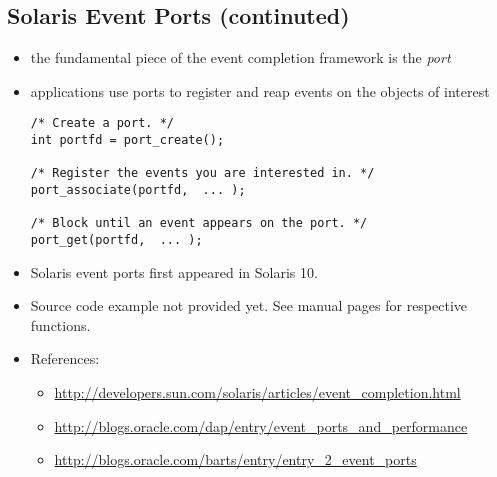 \subsection{Solaris Event Ports (continuted)}

\begin{itemize}
\item the fundamental piece of the event completion framework is the \emph{port}
\item applications use ports to register and reap events on the objects of
interest

\begin{lstlisting}
/* Create a port. */
int portfd = port_create();

/* Register the events you are interested in. */
port_associate(portfd,  ... );

/* Block until an event appears on the port. */
port_get(portfd,  ... );
\end{lstlisting}
\end{itemize}


\label{SOLARIS_EVENT_PORTS}

\begin{itemize}
\item Solaris event ports first appeared in Solaris 10.
\item Source code example not provided yet. See manual pages for respective functions.
\item References:
	\begin{itemize}
	\item \url{http://developers.sun.com/solaris/articles/event\_completion.html}
	\item \url{http://blogs.oracle.com/dap/entry/event\_ports\_and\_performance}
	\item \url{http://blogs.oracle.com/barts/entry/entry\_2\_event\_ports}
	\end{itemize}
\end{itemize}

%
%

